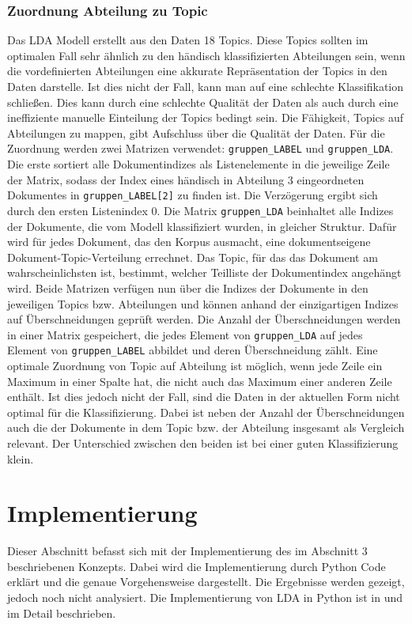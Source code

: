 \documentclass[german,version-2020-11]{uzl-thesis}
\begin{document}
\subsection{Zuordnung Abteilung zu Topic}
Das LDA Modell erstellt aus den Daten 18 Topics. Diese Topics sollten im optimalen Fall sehr ähnlich zu den händisch klassifizierten Abteilungen sein, wenn die vordefinierten Abteilungen eine akkurate Repräsentation der Topics in den Daten darstelle. Ist dies nicht der Fall, kann man auf eine schlechte Klassifikation schließen. Dies kann durch eine schlechte Qualität der Daten als auch durch eine ineffiziente manuelle Einteilung der Topics bedingt sein. Die Fähigkeit, Topics auf Abteilungen zu mappen, gibt Aufschluss über die Qualität der Daten. Für die Zuordnung werden zwei Matrizen verwendet: \lstinline{gruppen_LABEL} und \lstinline{gruppen_LDA}. Die erste sortiert alle Dokumentindizes als Listenelemente in die jeweilige Zeile der Matrix, sodass der Index eines händisch in Abteilung 3 eingeordneten Dokumentes in \lstinline{gruppen_LABEL[2]} zu finden ist. Die Verzögerung ergibt sich durch den ersten Listenindex $0$. Die Matrix \lstinline{gruppen_LDA} beinhaltet alle Indizes der Dokumente, die vom Modell klassifiziert wurden, in gleicher Struktur. Dafür wird für jedes Dokument, das den Korpus ausmacht, eine dokumentseigene Dokument-Topic-Verteilung errechnet. Das Topic, für das das Dokument am wahrscheinlichsten ist, bestimmt, welcher Teilliste der Dokumentindex angehängt wird. Beide Matrizen verfügen nun über die Indizes der Dokumente in den jeweiligen Topics bzw. Abteilungen und können anhand der einzigartigen Indizes auf Überschneidungen geprüft werden. Die Anzahl der Überschneidungen werden in einer Matrix gespeichert, die jedes Element von \lstinline{gruppen_LDA} auf jedes Element von \lstinline{gruppen_LABEL} abbildet und deren Überschneidung zählt. Eine optimale Zuordnung von Topic auf Abteilung ist möglich, wenn jede Zeile ein Maximum in einer Spalte hat, die nicht auch das Maximum einer anderen Zeile enthält. Ist dies jedoch nicht der Fall, sind die Daten in der aktuellen Form nicht optimal für die Klassifizierung. Dabei ist neben der Anzahl der Überschneidungen auch die der Dokumente in dem Topic bzw. der Abteilung insgesamt als Vergleich relevant. Der Unterschied zwischen den beiden ist bei einer guten Klassifizierung klein. 

\chapter{Implementierung}%
Dieser Abschnitt befasst sich mit der Implementierung des im Abschnitt 3 beschriebenen Konzepts. Dabei wird die Implementierung durch Python Code erklärt und die genaue Vorgehensweise dargestellt. Die Ergebnisse werden gezeigt, jedoch noch nicht analysiert. Die Implementierung von LDA in  Python ist in \cite{radim} und \cite{towardsdata} im Detail beschrieben. \\
\end{document}
